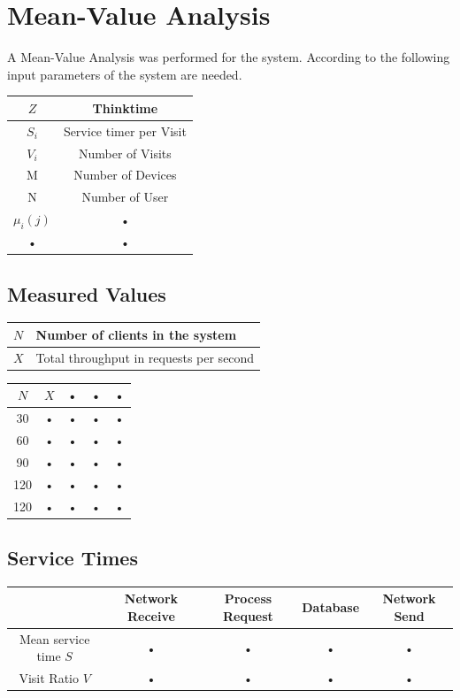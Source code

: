 \documentclass[a4paper]{article}
\begin{document}
\section{Mean-Value Analysis}

A Mean-Value Analysis was performed for the system. According to \cite[Box 31.2]{Raj} the following input parameters of the system are needed.

\begin{tabular}{|c|c|}
\hline 
$Z$ & Thinktime \\ 
\hline 
$S_i$ & Service timer per Visit \\ 
\hline 
$V_i$ & Number of Visits \\ 
\hline 
M & Number of Devices \\ 
\hline 
N & Number of User \\ 
\hline 
$\mu_i(j)$ & • \\ 
\hline 
• & • \\ 
\hline 
\end{tabular} 



\subsection{Measured Values}

\begin{tabular}{|l|l|}
\hline 
$N$ & Number of clients in the system \\ 
\hline 
$X$ & Total throughput in requests per second \\ 
\hline 
\end{tabular} 

\begin{tabular}{|c|c|c|c|c|}
\hline 
$N$ & $X$ & • & • & • \\ 
\hline 
30 & • & • & • & • \\ 
\hline 
60 & • & • & • & • \\ 
\hline 
90 & • & • & • & • \\ 
\hline 
120 & • & • & • & • \\ 
\hline 
120 & • & • & • & • \\ 
\hline 
\end{tabular} 

\subsection{Service Times}

\begin{tabular}{|c|c|c|c|c|}
\hline 
  & Network Receive & Process Request & Database & Network Send \\ 
\hline 
Mean service time $S$ & • & • & • & • \\ 
\hline 
Visit Ratio $V$ & • & • & • & • \\ 

\hline 
\end{tabular} 
\end{document}
